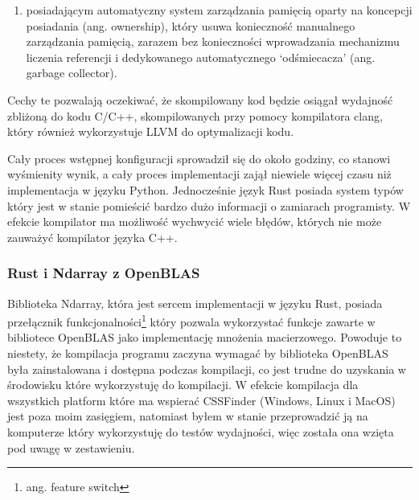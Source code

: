 \documentclass[11pt, a4paper]{article}
\begin{document}
\begin{sloppypar}
\begin{enumerate}
      \item posiadającym automatyczny system zarządzania pamięcią oparty na koncepcji posiadania
        (ang. ownership), który usuwa konieczność manualnego zarządzania pamięcią,
        zarazem bez konieczności wprowadzania mechanizmu liczenia referencji i
        dedykowanego automatycznego `odśmiecacza' (ang. garbage collector).
    \end{enumerate}

    Cechy te pozwalają oczekiwać, że skompilowany kod będzie osiągał wydajność zbliżoną
    do kodu C/C++, skompilowanych przy pomocy kompilatora clang, który również
    wykorzystuje LLVM do optymalizacji kodu.

    Cały proces wstępnej konfiguracji sprowadził się do około godziny, co stanowi wyśmienity
    wynik, a cały proces implementacji zajął niewiele więcej czasu niż implementacja w
    języku Python. Jednocześnie język Rust posiada system typów który jest w stanie pomieścić
    bardzo dużo informacji o zamiarach programisty. W efekcie kompilator ma możliwość
    wychwycić wiele błędów, których nie może zauważyć kompilator języka C++.

    \subsubsection{Rust i Ndarray z OpenBLAS}
    Biblioteka Ndarray, która jest sercem implementacji w języku Rust, posiada przełącznik
    funkcjonalności\footnote{ang. feature switch} który pozwala wykorzystać funkcje
    zawarte w bibliotece OpenBLAS jako implementację mnożenia macierzowego. Powoduje to niestety,
    że kompilacja programu zaczyna wymagać by biblioteka OpenBLAS była zainstalowana i
    dostępna podczas kompilacji, co jest trudne do uzyskania w środowisku które wykorzystuję
    do kompilacji. W efekcie kompilacja dla wszystkich platform które ma wspierać
    CSSFinder (Windows, Linux i MacOS) jest poza moim zasięgiem, natomiast byłem w
    stanie przeprowadzić ją na komputerze który wykorzystuję do testów wydajności, więc została
    ona wzięta pod uwagę w zestawieniu.


\end{sloppypar}
\end{document}
